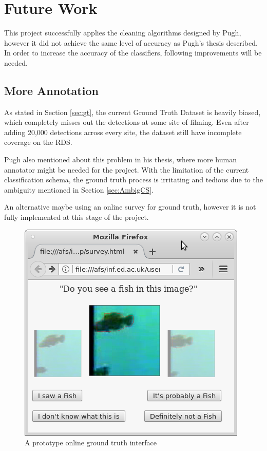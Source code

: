 \documentclass[bsc,logo,twoside,fullspacing,parskip]{infthesis}
\begin{document}
\section{Future Work}
\label{sec:future}

This project successfully applies the cleaning algorithms designed by Pugh\cite{Pugh}, however it did not achieve the same level of accuracy as Pugh's thesis described.
In order to increase the accuracy of the classifiers, following improvements will be needed.

\subsection{More Annotation}

As stated in Section \ref{sec:gt}, the current Ground Truth Dataset is heavily biased, which completely misses out the detections at some site of filming. 
Even after adding 20,000 detections across every site, the dataset still have incomplete coverage on the RDS. 

Pugh also mentioned about this problem in his thesis, where more human annotator might be needed for the project.
With the limitation of the current classification schema, the ground truth process is irritating and tedious due to the ambiguity mentioned in Section \ref{sec:AmbigCS}.

An alternative maybe using an online survey for ground truth, however it is not fully implemented at this stage of the project.

\begin{figure}[!h]
    \centering
    \includegraphics[scale=0.38]{graph/query.png}
    \caption{A prototype online ground truth interface}
    \label{fig:gto}
\end{figure}
\end{document}
